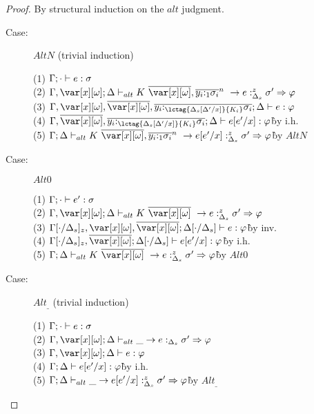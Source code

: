 \begin{proof}
By structural induction on the $alt$ judgment.

\begin{description}
\item[Case:] $AltN$ (trivial induction)
\begin{tabbing}
    (1) $\Gamma; \cdot \vdash e : \sigma$\\
    (2) $\G,\xo;\D \vdash_{alt} \konstructor~\to e :^z_{\D_s} \s' \Rightarrow \vp$\\
    (3) $\G,\xo,\ov{\xo},\ov{y_i{:}_{\lctag{\subst{\D_s}{\D'}{x}}{K_i}}\s_i}; \D \vdash e : \vp $\\
    (4) $\G,\ov{\xo},\ov{y_i{:}_{\lctag{\subst{\D_s}{\D'}{x}}{K_i}}\s_i}; \D \vdash e[e'/x] : \vp $\` by i.h.\\
    (5) $\G;\D \vdash_{alt} \konstructor~\to e[e'/x] :^z_{\D_s} \s' \Rightarrow \vp$\` by $AltN$\\
\end{tabbing}

\item[Case:] $Alt0$
\begin{tabbing}
    (1) $\Gamma;\cdot \vdash e' : \sigma$\\
    (2) $\G,\xo; \D \vdash_{alt} K~\ov{\xo}~\to e :^z_{\D_s} \s' \Rightarrow \vp$\\
    (3) $\G[\cdot/\D_s]_z,\xo,\ov{\xo}; \D[\cdot/\D_s] \vdash e : \vp$\` by inv.\\
    (4) $\G[\cdot/\D_s]_z,\ov{\xo}; \D[\cdot/\D_s] \vdash e[e'/x] : \vp$\` by i.h.\\
    (5) $\G; \D \vdash_{alt} K~\ov{\xo}~\to e :^z_{\D_s} \s' \Rightarrow \vp$\` by $Alt0$\\
\end{tabbing}

\item[Case:] $Alt_\_$ (trivial induction)
\begin{tabbing}
    (1) $\Gamma;\cdot \vdash e : \sigma$\\
    (2) $\G,\xo;\D \vdash_{alt} \_ \to e :_{\D_s} \s' \Rightarrow \vp$\\
    (3) $\G,\xo;\D \vdash e : \vp$\\
    (4) $\Gamma;\Delta \vdash e[e'/x] : \varphi$\` by i.h.\\
    (5) $\Gamma;\Delta \vdash_{alt} \_ \to e[e'/x] :^z_{\Delta_s} \sigma' \Rightarrow \varphi$\` by $Alt_\_$\\
\end{tabbing}

\end{description}
\end{proof}
